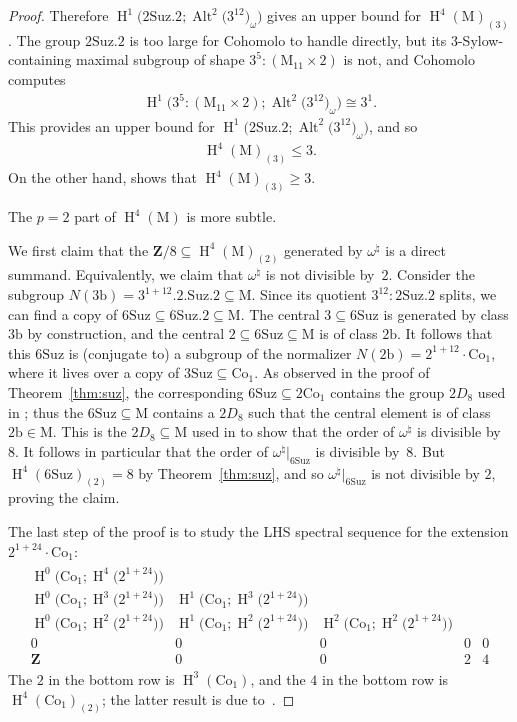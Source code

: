 \documentclass[pdftex]{sigma}
\numberwithin{equation}{section}
\newcommand\bZ{\mathbf Z}
\newcommand\rb{\mathrm b}
\newcommand\rM{\mathrm M}
\DeclareMathOperator\homology{H}
\renewcommand\H{\homology}
\newcommand\<\langle
\renewcommand\>\rangle
\newcommand\Co{\mathrm{Co}}
\newcommand\Suz{\mathrm{Suz}}
\DeclareMathOperator\Alt{Alt}
\begin{document}
\begin{proof}
 Therefore $\H^1\big(2\Suz.2; \Alt^2\big(3^{12}\big)_\omega\big)$ gives an upper bound for $\H^4(\rM)_{(3)}$. The group $2\Suz.2$ is too large for Cohomolo to handle directly, but its $3$-Sylow-containing maximal subgroup of shape $3^5:(\rM_{11} \times 2)$ is not, and Cohomolo computes
 \begin{gather*} \H^1\big( 3^5:(\rM_{11} \times 2); \Alt^2\big(3^{12}\big)_\omega\big) \cong 3^1. \end{gather*}
 This provides an upper bound for $\H^1\big(2\Suz.2; \Alt^2\big(3^{12}\big)_\omega\big)$, and so
 \begin{gather*} \H^4(\rM)_{(3)} \leq 3. \end{gather*}
 On the other hand, \cite[Lemma 3.2.4]{JFmoonshine} shows that $\H^4(\rM)_{(3)} \geq 3$.

 The $p=2$ part of $\H^4(\rM)$ is more subtle.

We first claim that the $\bZ/8 \subseteq \H^4(\rM)_{(2)}$ generated by $\omega^\natural$ is a direct summand. Equivalently, we claim that $\omega^\natural$ is not divisible by~$2$. Consider the subgroup $N(3\rb) = 3^{1+12}.2.\Suz.2 \subseteq \rM$. Since its quotient $3^{12}:2\Suz.2$ splits, we can find a copy of $6\Suz \subseteq 6\Suz.2 \subseteq \rM$. The central $3 \subseteq 6\Suz$ is generated by class $3\rb$ by construction, and the central $2 \subseteq 6\Suz \subseteq \rM$ is of class $2\rb$. It follows that this $6\Suz$ is (conjugate to) a subgroup of the normalizer $N(2\rb) = 2^{1+12}\cdot \Co_1$, where it lives over a copy of $3\Suz \subseteq \Co_1$. As observed in the proof of Theorem~\ref{thm:suz}, the corresponding $6\Suz \subseteq 2\Co_1$ contains the group $2D_8$ used in \cite{jft}; thus the $6\Suz \subseteq \rM$ contains a $2D_8$ such that the central element is of class $2\rb \in \rM$. This is the $2D_8 \subseteq \rM$ used in \cite[Section~3.3]{JFmoonshine} to show that the order of $\omega^\natural$ is divisible by $8$. It follows in particular that the order of $\omega^\natural|_{6\Suz}$ is divisible by~$8$. But $\H^4(6\Suz)_{(2)} = 8$ by Theorem~\ref{thm:suz}, and so $\omega^\natural|_{6\Suz}$ is not divisible by $2$, proving the claim.

 The last step of the proof is to study the LHS spectral sequence for the extension $2^{1+24}\cdot\Co_1$:
 \begin{gather*} \begin{array}{ccccc}
 \H^0\big(\Co_1; \H^4\big(2^{1+24}\big)\big) \\
 \H^0\big(\Co_1; \H^3\big(2^{1+24}\big)\big) & \H^1\big(\Co_1; \H^3\big(2^{1+24}\big)\big) \\
 \H^0\big(\Co_1; \H^2\big(2^{1+24}\big)\big) & \H^1\big(\Co_1; \H^2\big(2^{1+24}\big)\big) & \H^2\big(\Co_1; \H^2\big(2^{1+24}\big)\big) \\
 0 & 0 & 0 & 0 & 0 \\
 \bZ & 0 & 0 & 2 & 4
 \end{array} \end{gather*}
 The $2$ in the bottom row is $\H^3(\Co_1)$, and the $4$ in the bottom row is $\H^4(\Co_1)_{(2)}$; the latter result is due to~\cite{jft}.


\end{proof}
\end{document}
